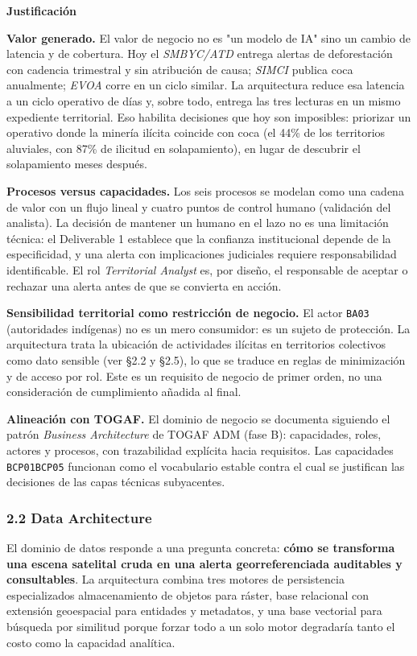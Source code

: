 \documentclass{article}
\newcommand{\mdhfour}[1]{\par\medskip\noindent\textbf{#1}\par\nobreak\smallskip}
\begin{document}
\mdhfour{Justificación}

\textbf{Valor generado.} El valor de negocio no es "un modelo de IA" sino un cambio de latencia y de cobertura. Hoy el \emph{SMBYC/ATD} entrega alertas de deforestación con cadencia trimestral y sin atribución de causa; \emph{SIMCI} publica coca anualmente; \emph{EVOA} corre en un ciclo similar. La arquitectura reduce esa latencia a un ciclo operativo de días y, sobre todo, entrega las tres lecturas en un mismo expediente territorial. Eso habilita decisiones que hoy son imposibles: priorizar un operativo donde la minería ilícita coincide con coca (el 44\% de los territorios aluviales, con 87\% de ilicitud en solapamiento), en lugar de descubrir el solapamiento meses después.

\textbf{Procesos versus capacidades.} Los seis procesos se modelan como una cadena de valor con un flujo lineal y cuatro puntos de control humano (validación del analista). La decisión de mantener un humano en el lazo no es una limitación técnica: el Deliverable 1 establece que la confianza institucional depende de la especificidad, y una alerta con implicaciones judiciales requiere responsabilidad identificable. El rol \emph{Territorial Analyst} es, por diseño, el responsable de aceptar o rechazar una alerta antes de que se convierta en acción.

\textbf{Sensibilidad territorial como restricción de negocio.} El actor \texttt{BA03} (autoridades indígenas) no es un mero consumidor: es un sujeto de protección. La arquitectura trata la ubicación de actividades ilícitas en territorios colectivos como dato sensible (ver \S{}2.2 y \S{}2.5), lo que se traduce en reglas de minimización y de acceso por rol. Este es un requisito de negocio de primer orden, no una consideración de cumplimiento añadida al final.

\textbf{Alineación con TOGAF.} El dominio de negocio se documenta siguiendo el patrón \emph{Business Architecture} de TOGAF ADM (fase B): capacidades, roles, actores y procesos, con trazabilidad explícita hacia requisitos. Las capacidades \texttt{BCP01}\textendash{}\texttt{BCP05} funcionan como el vocabulario estable contra el cual se justifican las decisiones de las capas técnicas subyacentes.

\subsubsection{2.2 Data Architecture}

El dominio de datos responde a una pregunta concreta: \textbf{cómo se transforma una escena satelital cruda en una alerta georreferenciada auditables y consultables}. La arquitectura combina tres motores de persistencia especializados \textemdash{}almacenamiento de objetos para ráster, base relacional con extensión geoespacial para entidades y metadatos, y una base vectorial para búsqueda por similitud\textemdash{} porque forzar todo a un solo motor degradaría tanto el costo como la capacidad analítica.
\end{document}
